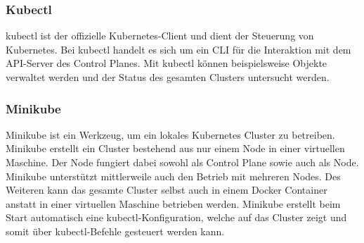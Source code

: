 \subsubsection{Kubectl}

kubectl ist der offizielle Kubernetes-Client und dient der Steuerung von Kubernetes. Bei kubectl handelt es sich um ein \ac{CLI} für die Interaktion mit dem \ac{API}-Server des Control Planes. Mit kubectl können beispielsweise Objekte verwaltet werden und der Status des gesamten Clusters untersucht werden.

\subsubsection{Minikube}

Minikube ist ein Werkzeug, um ein lokales Kubernetes Cluster zu betreiben. Minikube erstellt ein Cluster bestehend aus nur einem Node in einer virtuellen Maschine. Der Node fungiert dabei sowohl als Control Plane sowie auch als Node. Minikube unterstützt mittlerweile auch den Betrieb mit mehreren Nodes. Des Weiteren kann das gesamte Cluster selbst auch in einem Docker Container anstatt in einer virtuellen Maschine betrieben werden. Minikube erstellt beim Start automatisch eine kubectl-Konfiguration, welche auf das Cluster zeigt und somit über kubectl-Befehle gesteuert werden kann. 